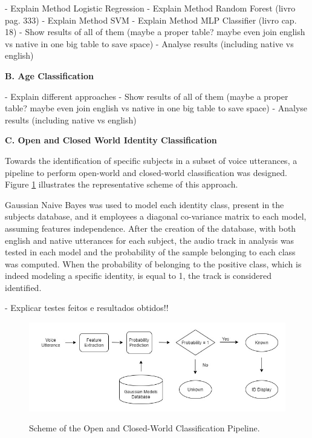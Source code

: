\documentclass{article}
\begin{document}
- Explain Method Logistic Regression
- Explain Method Random Forest (livro pag. 333)
- Explain Method SVM
- Explain Method MLP Classifier (livro cap. 18)
- Show results of all of them (maybe a proper table? maybe even join english vs native in one big table to save space)
- Analyse results (including native vs english)

\vspace{2mm}
\textbf{ B. Age Classification }\par

- Explain different approaches
- Show results of all of them (maybe a proper table? maybe even join english vs native in one big table to save space)
- Analyse results (including native vs english)

\vspace{2mm}
\textbf{ C. Open and Closed World Identity Classification }\par
Towards the identification of specific subjects in a subset of voice utterances, a pipeline to perform open-world and closed-world classification was designed. Figure \ref{fig:identificationScheme} illustrates the representative scheme of this approach.\par

Gaussian Naive Bayes was used to model each identity class, present in the subjects database, and it employees a diagonal co-variance matrix to each model, assuming features independence. After the creation of the database, with both english and native utterances for each subject, the audio track in analysis was tested in each model and the probability of the sample belonging to each class was computed. When the probability of belonging to the positive class, which is indeed modeling a specific identity, is equal to 1, the track is considered identified.\par

- Explicar testes feitos e resultados obtidos!!\par

\begin{figure}
\caption{Scheme of the Open and Closed-World Classification Pipeline.}
\centering
\includegraphics[scale=0.4]{DACOIdentities.jpg}
 \label{fig:identificationScheme}
\end{figure}
\end{document}
